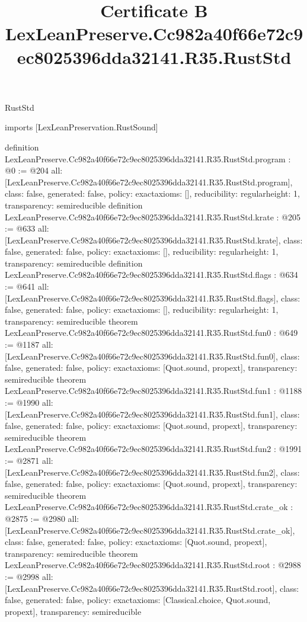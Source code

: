 \begin{lexlean}{RustStd}
\title{Certificate B LexLeanPreserve.Cc982a40f66e72c9ec8025396dda32141.R35.RustStd}
\begin{coremodule}
imports [LexLeanPreservation.RustSound]

definition LexLeanPreserve.Cc982a40f66e72c9ec8025396dda32141.R35.RustStd.program : @0 := @204 {
  all: [LexLeanPreserve.Cc982a40f66e72c9ec8025396dda32141.R35.RustStd.program],
  class: false,
  generated: false,
  policy: exact{axioms: []},
  reducibility: regular{height: 1},
  transparency: semireducible
}
definition LexLeanPreserve.Cc982a40f66e72c9ec8025396dda32141.R35.RustStd.krate : @205 := @633 {
  all: [LexLeanPreserve.Cc982a40f66e72c9ec8025396dda32141.R35.RustStd.krate],
  class: false,
  generated: false,
  policy: exact{axioms: []},
  reducibility: regular{height: 1},
  transparency: semireducible
}
definition LexLeanPreserve.Cc982a40f66e72c9ec8025396dda32141.R35.RustStd.flags : @634 := @641 {
  all: [LexLeanPreserve.Cc982a40f66e72c9ec8025396dda32141.R35.RustStd.flags],
  class: false,
  generated: false,
  policy: exact{axioms: []},
  reducibility: regular{height: 1},
  transparency: semireducible
}
theorem LexLeanPreserve.Cc982a40f66e72c9ec8025396dda32141.R35.RustStd.fun0 : @649 := @1187 {
  all: [LexLeanPreserve.Cc982a40f66e72c9ec8025396dda32141.R35.RustStd.fun0],
  class: false,
  generated: false,
  policy: exact{axioms: [Quot.sound, propext]},
  transparency: semireducible
}
theorem LexLeanPreserve.Cc982a40f66e72c9ec8025396dda32141.R35.RustStd.fun1 : @1188 := @1990 {
  all: [LexLeanPreserve.Cc982a40f66e72c9ec8025396dda32141.R35.RustStd.fun1],
  class: false,
  generated: false,
  policy: exact{axioms: [Quot.sound, propext]},
  transparency: semireducible
}
theorem LexLeanPreserve.Cc982a40f66e72c9ec8025396dda32141.R35.RustStd.fun2 : @1991 := @2871 {
  all: [LexLeanPreserve.Cc982a40f66e72c9ec8025396dda32141.R35.RustStd.fun2],
  class: false,
  generated: false,
  policy: exact{axioms: [Quot.sound, propext]},
  transparency: semireducible
}
theorem LexLeanPreserve.Cc982a40f66e72c9ec8025396dda32141.R35.RustStd.crate_ok : @2875 := @2980 {
  all: [LexLeanPreserve.Cc982a40f66e72c9ec8025396dda32141.R35.RustStd.crate_ok],
  class: false,
  generated: false,
  policy: exact{axioms: [Quot.sound, propext]},
  transparency: semireducible
}
theorem LexLeanPreserve.Cc982a40f66e72c9ec8025396dda32141.R35.RustStd.root : @2988 := @2998 {
  all: [LexLeanPreserve.Cc982a40f66e72c9ec8025396dda32141.R35.RustStd.root],
  class: false,
  generated: false,
  policy: exact{axioms: [Classical.choice, Quot.sound, propext]},
  transparency: semireducible
}


\end{coremodule}
\end{lexlean}
